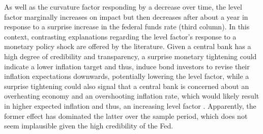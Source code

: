 As well as the curvature factor responding by a decrease over time, the level factor marginally increases on impact but then decreases after about a year in response to a surprise increase in the federal funds rate (third column). 
In this context, contrasting explanations regarding the level factor's response to a monetary policy shock are offered by the literature. 
Given a central bank has a high degree of credibility and transparency, a surprise monetary tightening could indicate a lower inflation target and thus, induce bond investors to revise their inflation expectations downwards, potentially lowering the level factor, while a surprise tightening could also signal that a central bank is concerned about an overheating economy and an overshooting inflation rate, which would likely result in higher expected inflation and thus, an increasing level factor \citep{diebold2006macroeconomy}. 
Apparently, the former effect has dominated the latter over the sample period, which does not seem implausible given the high credibility of the Fed. 

